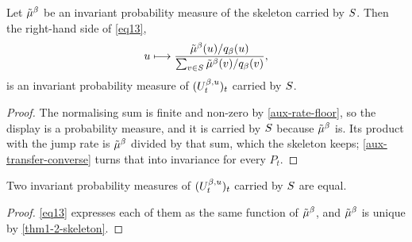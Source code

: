 \begin{theorem}
  \label{thm1-2-exists}
  \leanok
  Let $\tilde{\mu}^\beta$ be an invariant probability measure of the skeleton carried by
  $S$.  Then the right-hand side of \ref{eq13},
  \[
    u \longmapsto \frac{\tilde{\mu}^\beta(u)/q_\beta(u)}
                       {\sum_{v \in S} \tilde{\mu}^\beta(v)/q_\beta(v)} ,
  \]
  is an invariant probability measure of $(U^{\beta,u}_t)_t$ carried by
  $S$.
\end{theorem}
\begin{proof}
  \leanok
  The normalising sum is finite and non-zero by \ref{aux-rate-floor}, so the
  display is a probability measure, and it is carried by $S$ because
  $\tilde{\mu}^\beta$ is.  Its product with the jump rate is $\tilde{\mu}^\beta$ divided by that
  sum, which the skeleton keeps; \ref{aux-transfer-converse} turns that into
  invariance for every $P_t$.
\end{proof}

\begin{theorem}
  \label{thm1-2-unique}
  \leanok
  Two invariant probability measures of $(U^{\beta,u}_t)_t$ carried by $S$
  are equal.
\end{theorem}
\begin{proof}
  \leanok
  \ref{eq13} expresses each of them as the same function of $\tilde{\mu}^\beta$, and
  $\tilde{\mu}^\beta$ is unique by \ref{thm1-2-skeleton}.
\end{proof}

